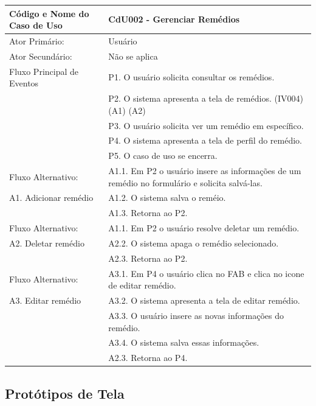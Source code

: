 \documentclass[12pt]{article}
\begin{document}
\begin{titlepage}
\begin{center}
  \begin{tabular}{ | l |  p{10cm} |}
    \hline
    Código e Nome do Caso de Uso & CdU002 - Gerenciar Remédios \\ \hline
    Ator Primário: & Usuário \\ 
    Ator Secundário: & Não se aplica \\ \hline
    Fluxo Principal de Eventos & P1. O usuário solicita consultar os remédios. \\
                               & P2. O sistema apresenta a tela de remédios. (IV004) (A1) (A2) \\
                               & P3. O usuário solicita ver um remédio em específico. \\
                               & P4. O sistema apresenta a tela de perfil do remédio. \\
                               & P5. O caso de uso se encerra. \\ \hline
    Fluxo Alternativo:         & A1.1. Em P2 o usuário insere as informações de um remédio no formulário e solicita salvá-las. \\
    A1. Adicionar remédio      & A1.2. O sistema salva o reméio. \\ 
			       & A1.3. Retorna ao P2. \\ \hline
    Fluxo Alternativo:         & A1.1. Em P2 o usuário resolve deletar um remédio. \\
    A2. Deletar remédio        & A2.2. O sistema apaga o remédio selecionado. \\
			       & A2.3. Retorna ao P2. \\ \hline
    Fluxo Alternativo:         & A3.1. Em P4 o usuário clica no FAB e clica no icone de editar remédio. \\
    A3. Editar remédio         & A3.2. O sistema apresenta a tela de editar remédio. \\
			       & A3.3. O usuário insere as novas informações do remédio. \\
                               & A3.4. O sistema salva essas informações. \\
			       & A2.3. Retorna ao P4. \\
    \hline
  \end{tabular}
\end{center}

\newpage

\subsection{Protótipos de Tela}


\end{titlepage}
\end{document}
